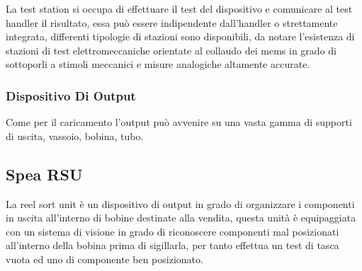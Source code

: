 La test station si occupa di effettuare il test del dispositivo e comunicare al test handler il risultato, essa può essere indipendente dall’handler o strettamente integrata, differenti tipologie di stazioni sono 
disponibili, da notare l’esistenza di stazioni di test elettromeccaniche orientate al collaudo dei mems in 
grado di sottoporli a stimoli meccanici e misure analogiche altamente accurate.  

\subsubsection{Dispositivo Di Output} 

Come per il caricamento l’output può avvenire su una vasta gamma di supporti di uscita, vassoio, bobina, 
tubo. 

\subsection{Spea RSU} 

La reel sort unit è un dispositivo di output in grado di organizzare i componenti in uscita all’interno di 
bobine destinate alla vendita, questa unità è equipaggiata con un sistema di visione in grado di 
riconoscere componenti mal posizionati all’interno della bobina prima di sigillarla, per  tanto effettua un 
test di tasca vuota ed uno di componente ben posizionato. 


\endinput